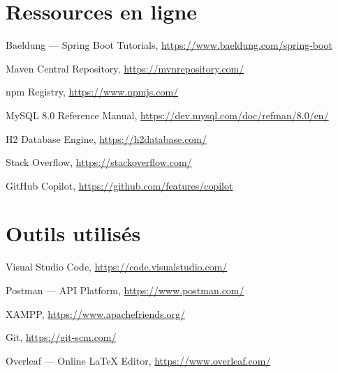 \section*{Ressources en ligne}

\begin{enumerate}[label={[\arabic*]},noitemsep,start=13]
    \item Baeldung — Spring Boot Tutorials, \url{https://www.baeldung.com/spring-boot}
    \item Maven Central Repository, \url{https://mvnrepository.com/}
    \item npm Registry, \url{https://www.npmjs.com/}
    \item MySQL 8.0 Reference Manual, \url{https://dev.mysql.com/doc/refman/8.0/en/}
    \item H2 Database Engine, \url{https://h2database.com/}
    \item Stack Overflow, \url{https://stackoverflow.com/}
    \item GitHub Copilot, \url{https://github.com/features/copilot}
\end{enumerate}

\section*{Outils utilisés}

\begin{enumerate}[label={[\arabic*]},noitemsep,start=20]
    \item Visual Studio Code, \url{https://code.visualstudio.com/}
    \item Postman — API Platform, \url{https://www.postman.com/}
    \item XAMPP, \url{https://www.apachefriends.org/}
    \item Git, \url{https://git-scm.com/}
    \item Overleaf — Online LaTeX Editor, \url{https://www.overleaf.com/}
\end{enumerate}

\newpage
